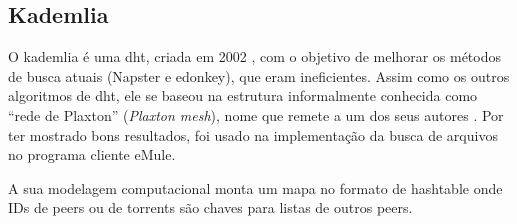 
\subsection*{Kademlia}

O \gls{kademlia} é uma \gls*{dht}, criada em 2002 \cite{artigo:kademlia}, com o objetivo
de melhorar os métodos de busca atuais (Napster e \gls*{edonkey}), que eram
ineficientes. Assim como os outros algoritmos de \gls*{dht}, ele se baseou na estrutura
informalmente conhecida como \enquote{rede de Plaxton} (\emph{Plaxton mesh}), nome que
remete a um dos seus autores \cite{artigo:dht}. Por ter mostrado bons resultados, foi
usado na implementação da busca de arquivos no programa cliente eMule.

A sua modelagem computacional monta um mapa no formato de \gls*{hashtable} onde IDs de
\glspl*{peer} ou de \glspl*{torrent} são chaves para listas de outros \glspl*{peer}.










